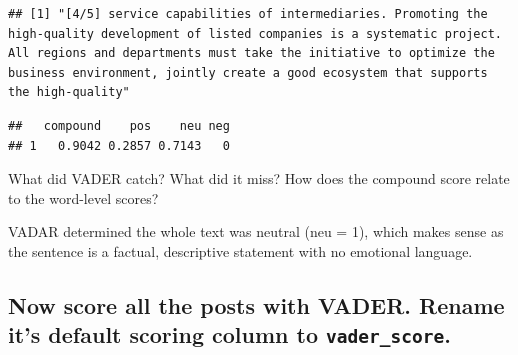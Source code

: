 \documentclass[
]{article}
\newenvironment{Shaded}{\begin{snugshade}}{\end{snugshade}}
\newcommand{\AttributeTok}[1]{\textcolor[rgb]{0.13,0.29,0.53}{#1}}
\newcommand{\DecValTok}[1]{\textcolor[rgb]{0.00,0.00,0.81}{#1}}
\newcommand{\FunctionTok}[1]{\textcolor[rgb]{0.13,0.29,0.53}{\textbf{#1}}}
\newcommand{\NormalTok}[1]{#1}
\newcommand{\OtherTok}[1]{\textcolor[rgb]{0.56,0.35,0.01}{#1}}
\newcommand{\SpecialCharTok}[1]{\textcolor[rgb]{0.81,0.36,0.00}{\textbf{#1}}}
\begin{document}
\begin{verbatim}
## [1] "[4/5] service capabilities of intermediaries. Promoting the high-quality development of listed companies is a systematic project. All regions and departments must take the initiative to optimize the business environment, jointly create a good ecosystem that supports the high-quality"
\end{verbatim}

\begin{Shaded}
\end{Shaded}

\begin{verbatim}
##   compound    pos    neu neg
## 1   0.9042 0.2857 0.7143   0
\end{verbatim}

What did VADER catch? What did it miss? How does the compound score
relate to the word-level scores?

VADAR determined the whole text was neutral (neu = 1), which makes sense
as the sentence is a factual, descriptive statement with no emotional
language.

\subsection{\texorpdfstring{Now score all the posts with VADER. Rename
it's default scoring column to
\texttt{vader\_score}.}{Now score all the posts with VADER. Rename it's default scoring column to vader\_score.}}\label{now-score-all-the-posts-with-vader.-rename-its-default-scoring-column-to-vader_score.}

\begin{Shaded}
\end{Shaded}
\end{document}
